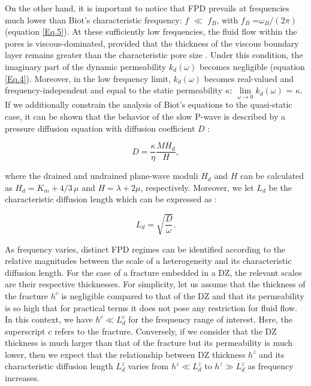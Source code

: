 \documentclass[draft]{agujournal2019}
\begin{document}
On the other hand, it is important to notice that FPD prevails at frequencies much lower than Biot's characteristic frequency: $f$ $\ll$ $f_B$, with $f_B$ =$\omega_B/(2 \pi)$ (equation \ref{Eq.5}). At these sufficiently low frequencies, the fluid flow within the pores is viscous-dominated,  provided that the thickness of the viscous boundary layer remains greater than the characteristic pore size \cite{Johnson1987}. Under this condition, the  imaginary part of the dynamic permeability $k_d (\omega)$ becomes negligible (equation \ref{Eq.4}).
Moreover, in the low frequency limit, $k_d (\omega)$  becomes real-valued and frequ\-ency\--independent and equal to the static permeability $\kappa$: $ \lim \limits_{\omega \to 0}k_d (\omega)$ = $\kappa$. If we additionally constrain the analysis of Biot's equations to the quasi-static case, it can be shown that the behavior of the slow P-wave is described by a pressure diffusion equation with diffusion coefficient $D$ \cite{Chandler1981}: 
\begin{linenomath*}
\begin{equation}\label{Eq.19}
D = \frac{\kappa}{\eta} \frac{M H_d}{H},
\end{equation}
\end{linenomath*}
where the drained and undrained plane-wave moduli $H_d$ and $H$ can be calculated as $H_d= K_m + 4/3 \,\mu$ and $H = \lambda + 2 \mu$, respectively. Moreover, we let  $L_d$ be the characteristic diffusion length which can be expressed as \cite{Norris1993}: 
\begin{linenomath*}
\begin{equation}\label{Eq.20}
L_d = \sqrt{\frac{D}{\omega}}.
\end{equation}
\end{linenomath*}
As frequency varies, distinct FPD regimes can be identified according to the relative magnitudes between the scale of a heterogeneity and its characteristic diffusion length. For the case of a fracture embedded in a DZ, the relevant scales are their respective thicknesses. For simplicity, let us assume that the thickness of the fracture $h^c$ is negligible compared to that of the DZ and that its permeability is so high that for practical terms it does not pose any restriction for fluid flow. In this context, we have $h^c \ll L_d^c$ for the frequency range of interest. Here, the superscript $c$ refers to the fracture. Conversely, if we consider that the DZ thickness is much larger than that of the fracture but its permeability is much lower, then we expect that the relationship between DZ thickness $h^z$ and its characteristic diffusion length $L_d^z$  varies from $h^z\ll L_d^z$  to $h^z\gg L_d^z$ as frequency increases.
\end{document}

